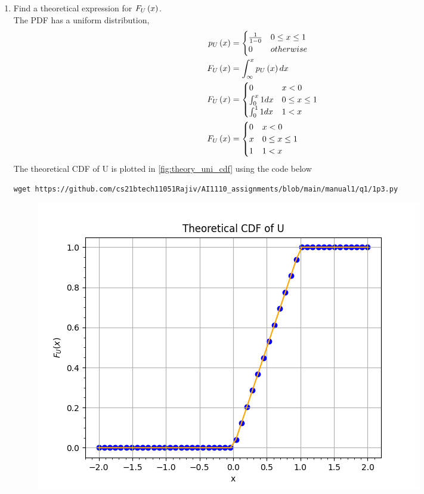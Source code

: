 \documentclass[journal,12pt,twocolumn]{IEEEtran}
\renewcommand\thesection{\arabic{section}}
\begin{document}
\begin{enumerate}[label=\thesection.\arabic*
,ref=\thesection.\theenumi]
%
\item
Find a theoretical expression for $F_{U}\left(x\right)$.
\\
\solution The PDF has a uniform distribution,
\begin{align}
    p_U\left(x\right) &=
        \begin{cases}\frac{1}{1-0} & 0 \le x \le 1 \\
        0 & otherwise
    \end{cases}\\
    F_{U}\left(x\right) &= \int^{x}_{\infty} p_U\left(x\right) dx \\
    F_U\left(x\right) &=
    \begin{cases}  
        0 & x < 0\\
        \int^{x}_{0} 1 dx & 0 \le x \le 1 \\
        \int^{1}_{0} 1 dx & 1 < x
    \end{cases}\\
    F_U\left(x\right) &=
    \begin{cases}  
        0 & x < 0\\
        x & 0 \le x \le 1 \\
        1 & 1 < x
    \end{cases}
    \label{eq:F_U}
\end{align}
\solution  The theoretical CDF of U is plotted in \ref{fig:theory_uni_cdf} using the code below
\begin{lstlisting}
wget https://github.com/cs21btech11051Rajiv/AI1110_assignments/blob/main/manual1/q1/1p3.py
\end{lstlisting}
\begin{figure}[ht!]
    \centering
    \includegraphics[width=\columnwidth]{./figs/fig1.3.png}

\end{figure}
\end{enumerate}
\end{document}
